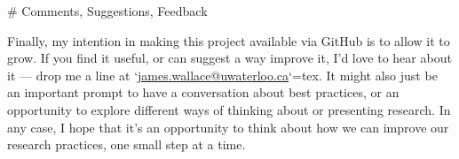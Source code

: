 \begin{markdown}
# Comments, Suggestions, Feedback

Finally, my intention in making this project available via GitHub is to allow it to grow. If you find it useful, or can suggest a way improve it, I'd love to hear about it --- drop me a line at `\href{mailto:james.wallace@uwaterloo.ca}{james.wallace@uwaterloo.ca}`{=tex}. It might also just be an important prompt to have a conversation about best practices, or an opportunity to explore different ways of thinking about or presenting research. In any case, I hope that it's an opportunity to think about how we can improve our research practices, one small step at a time. 

\end{markdown}




